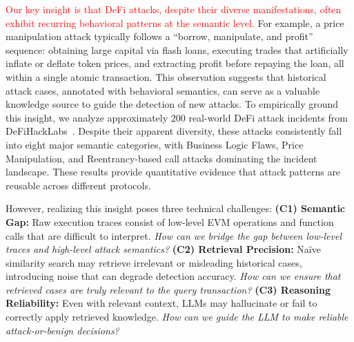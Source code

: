\textcolor{red}{Our key insight is that DeFi attacks, despite their diverse manifestations, often exhibit recurring behavioral patterns at the semantic level.} For example, a price manipulation attack typically follows a ``borrow, manipulate, and profit'' sequence: obtaining large capital via flash loans, executing trades that artificially inflate or deflate token prices, and extracting profit before repaying the loan, all within a single atomic transaction. This observation suggests that historical attack cases, annotated with behavioral semantics, can serve as a valuable knowledge source to guide the detection of new attacks. 
To empirically ground this insight, we analyze approximately 200 real-world DeFi attack incidents from DeFiHackLabs~\cite{defihacklabs2024}.
Despite their apparent diversity, these attacks consistently fall into eight major semantic categories, with Business Logic Flaws, Price Manipulation, and Reentrancy-based call attacks dominating the incident landscape.
These results provide quantitative evidence that attack patterns are reusable across different protocols.

However, realizing this insight poses three technical challenges: \textbf{(C1) Semantic Gap:} Raw execution traces consist of low-level EVM operations and function calls that are difficult to interpret. \textit{How can we bridge the gap between low-level traces and high-level attack semantics?} \textbf{(C2) Retrieval Precision:} Na\"ive similarity search may retrieve irrelevant or misleading historical cases, introducing noise that can degrade detection accuracy. \textit{How can we ensure that retrieved cases are truly relevant to the query transaction?} \textbf{(C3) Reasoning Reliability:} Even with relevant context, LLMs may hallucinate or fail to correctly apply retrieved knowledge. \textit{How can we guide the LLM to make reliable attack-or-benign decisions?}

